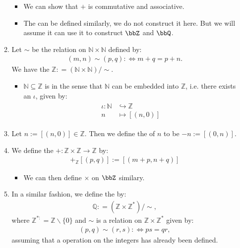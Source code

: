 \documentclass{article}
\begin{document}
\begin{enumerate}
\begin{enumerate}
\begin{itemize}
    \item We can show that $+$ is commutative and associative.
    \item The  can be defined similarly, we do not construct it here. But we will assume it can use it to construct $\bbZ$ and $\bbQ$.
\end{itemize}
\item Let $\sim$ be the relation on $\mathbb{N} \times \mathbb{N}$ defined by:
\begin{align*}
(m, n) \sim(p, q): \Leftrightarrow m+q=p+n .
\end{align*}
We have the  $\mathbb{Z:}=(\mathbb{N} \times \mathbb{N}) / \sim .$
\begin{itemize}
    \item $\mathbb{N}\subseteq \mathbb{Z}$ is in the sense that $\mathbb{N}$ can be embedded into $\mathbb{Z}$, i.e. there exists an  $\iota$, given by:
\begin{align*}
\begin{aligned}
\iota: \mathbb{N} & \hookrightarrow \mathbb{Z} \\
n & \mapsto[(n, 0)]
\end{aligned}
\end{align*}
\end{itemize}
\item  Let $n:=[(n, 0)] \in \mathbb{Z}$. Then we define the  of $n$ to be $-n:=[(0, n)]$.
\item We define the  $+: \mathbb{Z} \times \mathbb{Z} \rightarrow \mathbb{Z}$ by:
\begin{align*}
[(m, n)]+_{\mathbb{Z}}[(p, q)]:=[(m+p, n+q)]
\end{align*}
\begin{itemize}
    \item We can then define $\times$ on $\bbZ$ similary.
\end{itemize}
\item In a similar fashion, we define the  by:
\begin{align*}
\mathbb{Q:}=\left(\mathbb{Z} \times \mathbb{Z}^{*}\right) / \sim,
\end{align*}
where $\mathbb{Z}^{*:}=\mathbb{Z} \backslash\{0\}$ and $\sim$ is a relation on $\mathbb{Z} \times \mathbb{Z}^{*}$ given by:
\begin{align*}
(p, q) \sim(r, s): \Leftrightarrow p s=q r,
\end{align*}
assuming that a  operation on the integers has already been defined.


\end{enumerate}
\end{enumerate}
\end{document}
